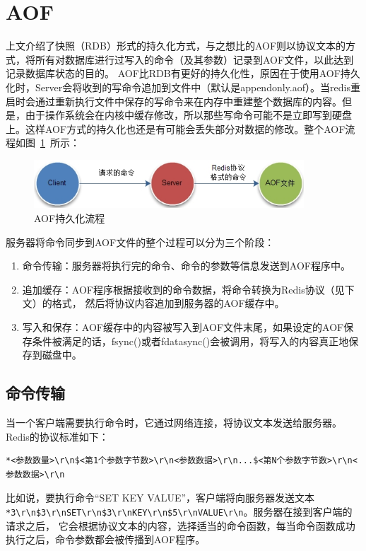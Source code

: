 \documentclass{zjutthesis}
\begin{document}
\section{AOF}
上文介绍了快照（RDB）形式的持久化方式，与之想比的AOF则以协议文本的方式，将所有对数据库进行过写入的命令（及其参数）记录到AOF文件，以此达到记录数据库状态的目的。
AOF比RDB有更好的持久化性，原因在于使用AOF持久化时，Server会将收到的写命令追加到文件中（默认是appendonly.aof）。当redis重启时会通过重新执行文件中保存的写命令来在内存中重建整个数据库的内容。但是，由于操作系统会在内核中缓存修改，所以那些写命令可能不是立即写到硬盘上。这样AOF方式的持久化也还是有可能会丢失部分对数据的修改。整个AOF流程如图~\ref{fig:AOF}~所示：
\begin{figure}[H]
\centering
\includegraphics[width=0.9\textwidth]{AOF}
\caption{AOF持久化流程}\label{fig:AOF}
\vspace{\baselineskip} %
\end{figure}

服务器将命令同步到AOF文件的整个过程可以分为三个阶段：
\begin{enumerate}[label=\arabic*.]
\item{命令传输：服务器将执行完的命令、命令的参数等信息发送到AOF程序中。}
\item{追加缓存：AOF程序根据接收到的命令数据，将命令转换为Redis协议（见下文）的格式，
然后将协议内容追加到服务器的AOF缓存中。}
\item{写入和保存：AOF缓存中的内容被写入到AOF文件末尾，如果设定的AOF保存条件被满足的话，fsync()或者fdatasync()会被调用，将写入的内容真正地保存到磁盘中。}
\end{enumerate}

\subsection{命令传输}
当一个客户端需要执行命令时，它通过网络连接，将协议文本发送给服务器。Redis的协议标准如下：
\begin{verbatim}
*<参数数量>\r\n$<第1个参数字节数>\r\n<参数数据>\r\n...$<第N个参数字节数>\r\n<参数数据>\r\n
\end{verbatim}
比如说，要执行命令“SET KEY VALUE”，客户端将向服务器发送文本\verb|*3\r\n$3\r\nSET\r\n$3\r\nKEY\r\n$5\r\nVALUE\r\n|。服务器在接到客户端的请求之后，
它会根据协议文本的内容，选择适当的命令函数，每当命令函数成功执行之后，命令参数都会被传播到AOF程序。
\end{document}
